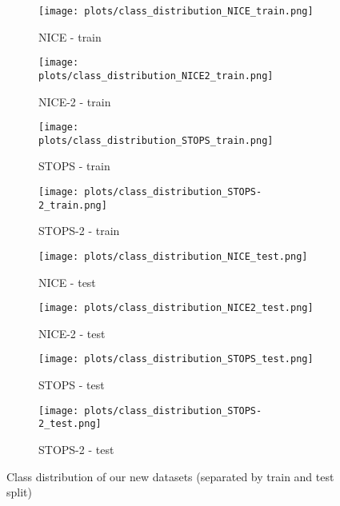 \documentclass[runningheads]{llncs}
\begin{document}
\begin{figure}[htbp]
\centering

\begin{subfigure}[t]{0.24\textwidth}
  \texttt{[image: plots/class\_distribution\_NICE\_train.png]}
  \caption{NICE - train}
\end{subfigure}
\hfill
\begin{subfigure}[t]{0.24\textwidth}
  \texttt{[image: plots/class\_distribution\_NICE2\_train.png]}
  \caption{NICE-2 - train}
\end{subfigure}
\hfill
\begin{subfigure}[t]{0.24\textwidth}
  \texttt{[image: plots/class\_distribution\_STOPS\_train.png]}
  \caption{STOPS - train}
\end{subfigure}
\hfill
\begin{subfigure}[t]{0.24\textwidth}
  \texttt{[image: plots/class\_distribution\_STOPS-2\_train.png]}
  \caption{STOPS-2 - train}
\end{subfigure}

\begin{subfigure}[t]{0.24\textwidth}
  \texttt{[image: plots/class\_distribution\_NICE\_test.png]}
  \caption{NICE - test}
\end{subfigure}
\hfill
\begin{subfigure}[t]{0.24\textwidth}
  \texttt{[image: plots/class\_distribution\_NICE2\_test.png]}
  \caption{NICE-2 - test}
\end{subfigure}
\hfill
\begin{subfigure}[t]{0.24\textwidth}
  \texttt{[image: plots/class\_distribution\_STOPS\_test.png]}
  \caption{STOPS - test}
\end{subfigure}
\hfill
\begin{subfigure}[t]{0.24\textwidth}
  \texttt{[image: plots/class\_distribution\_STOPS-2\_test.png]}
  \caption{STOPS-2 - test}
\end{subfigure}

\caption{Class distribution of our new datasets (separated by train and test split)}
\label{fig:dataset_statistics}
\end{figure}
\end{document}
